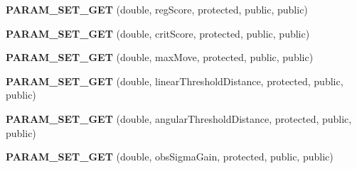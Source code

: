 \begin{DoxyCompactItemize}
{\bfseries P\+A\+R\+A\+M\+\_\+\+S\+E\+T\+\_\+\+G\+ET} (double, reg\+Score, protected, public, public)
\item 
\mbox{\label{classGMapping_1_1GridSlamProcessor_a98219e814eccc6bb63c1c69f9fa0447f}} 
{\bfseries P\+A\+R\+A\+M\+\_\+\+S\+E\+T\+\_\+\+G\+ET} (double, crit\+Score, protected, public, public)
\item 
\mbox{\label{classGMapping_1_1GridSlamProcessor_a61d3c3d7d5226a7ae92c365d1f3652b3}} 
{\bfseries P\+A\+R\+A\+M\+\_\+\+S\+E\+T\+\_\+\+G\+ET} (double, max\+Move, protected, public, public)
\item 
\mbox{\label{classGMapping_1_1GridSlamProcessor_a754c520cbb975790c970ca596e8a4b1f}} 
{\bfseries P\+A\+R\+A\+M\+\_\+\+S\+E\+T\+\_\+\+G\+ET} (double, linear\+Threshold\+Distance, protected, public, public)
\item 
\mbox{\label{classGMapping_1_1GridSlamProcessor_a77438894a9614deb0fdf3829ce6557ee}} 
{\bfseries P\+A\+R\+A\+M\+\_\+\+S\+E\+T\+\_\+\+G\+ET} (double, angular\+Threshold\+Distance, protected, public, public)
\item 
\mbox{\label{classGMapping_1_1GridSlamProcessor_ac86d3cc3827574c10f1169cb63323d23}} 
{\bfseries P\+A\+R\+A\+M\+\_\+\+S\+E\+T\+\_\+\+G\+ET} (double, obs\+Sigma\+Gain, protected, public, public)
\end{DoxyCompactItemize}
